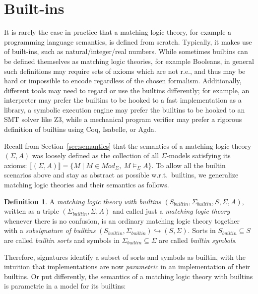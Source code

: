 \documentclass[UTF8,11pt]{article}
\newcounter{thmcounter}
\theoremstyle{plain}
\theoremstyle{definition}
\newtheorem{definition} [thmcounter]{Definition}
\theoremstyle{remark}
\newcommand{\Mod}{\textit{Mod}}
\newcommand{\denote}[1]{\llbracket{#1}\rrbracket}
\newcommand{\builtin}{\textit{builtin}}
\begin{document}
\section{Built-ins}
\label{sec:builtins}

It is rarely the case in practice that a matching logic theory, for example
a programming language semantics, is defined from scratch.
Typically, it makes use of built-ins, such as natural/integer/real numbers.
While sometimes builtins can be defined themselves as matching logic theories,
for example Booleans, in general such definitions may require sets of axioms
which are not r.e., and thus may be hard or impossible to encode regardless
of the chosen formalism.
Additionally, different tools may need to regard or use the builtins
differently;
for example, an interpreter may prefer the builtins to be hooked to a
fast implementation as a library, a symbolic execution engine may prefer the
builtins to be hooked to an SMT solver like Z3, while a mechanical program
verifier may prefer a rigorous definition of builtins using Coq, Isabelle,
or Agda.

Recall from Section~\ref{sec:semantics} that the semantics of a matching
logic theory $(\Sigma,A)$ was loosely defined as the collection of all
$\Sigma$-models satisfying its axioms: $\denote{(\Sigma,A)} =
\{M \mid M \in \Mod_{\Sigma},\ M \models_{\Sigma} A \}$.
To allow all the builtin scenarios above and stay as abstract as possible
w.r.t.~builtins, we generalize matching logic theories and their semantics
as follows.

\begin{definition}
A \emph{matching logic theory with builtins}
$(S_\builtin,\Sigma_\builtin,S,\Sigma,A)$, written as a triple
$(\Sigma_\builtin,\Sigma,A)$ and
called just a \emph{matching logic theory} whenever there is no confusion,
is an ordinary matching logic theory together with a
\emph{subsignature of builtins}
$(S_\builtin,\Sigma_\builtin)\hookrightarrow(S,\Sigma)$.
Sorts in $S_\builtin \subseteq S$ are called \emph{builtin sorts} and symbols in
$\Sigma_\builtin \subseteq \Sigma$ are called \emph{builtin symbols}.
\end{definition}

Therefore, signatures identify a subset of sorts and symbols as builtin,
with the intuition that implementations are now \emph{parametric} in an
implementation of their builtins.
Or put differently, the semantics of a matching logic theory with builtins
is parametric in a model for its builtins:
\end{document}
